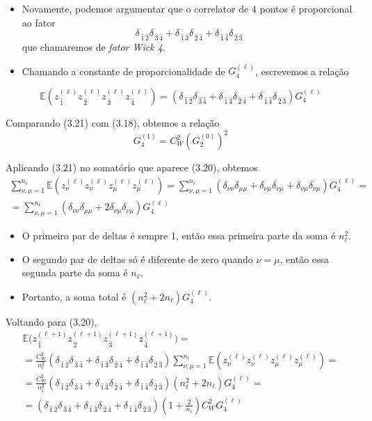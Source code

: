 \documentclass{beamer}
\newcommand{\EE}{\mathbb{E}}
\def\mi#1{{\,\widehat{#1}}}
\def\eell{{(\ell)}}
\def\eellum{{(\ell+1)}}
\def\wickquatro{\delta_{\mi1\mi2}\delta_{\mi3\mi4} + \delta_{\mi1\mi3}\delta_{\mi2\mi4}+  \delta_{\mi1\mi4}\delta_{\mi2\mi3}}
\begin{document}
\begin{frame}
	\begin{itemize}
		\item Novamente, podemos argumentar que o correlator de 4 pontos é proporcional ao fator 
		 $$\wickquatro $$
		que chamaremos de \textit{fator Wick 4}.
		\item Chamando a constante de proporcionalidade de $G_4^\eell$, escrevemos a relação
	\end{itemize}

	\begin{equation*}\tag{3.21}
		\EE\left(z^\eell _\mi1 z^\eell_\mi2 z^\eell_\mi3 z^\eell_\mi4\right) = \left(\wickquatro \right)G_4^\eell
	\end{equation*}
\end{frame}

\begin{frame}
	Comparando (3.21) com (3.18), obtemos a relação
	\begin{equation*}\tag{3.22}
		G_4^{(1)} = {C_W^2}\left(G_2^{(0)}\right)^2
	\end{equation*}
\end{frame}

\begin{frame}
	
	Aplicando (3.21) no somatório que aparece (3.20), obtemos
	\begin{multline*}\tag{3.23}
		\sum_{\nu,\mu=1}^{n_\ell} \EE\left( z^\eell_{\nu}z^\eell_{\nu} z^\eell_{\mu}z^\eell_{\mu}\right)
		= \sum_{\nu,\mu=1}^{n_\ell} \left( \delta_{\nu\nu}\delta_{\mu\mu} + \delta_{\nu\mu}\delta_{\nu\mu} + \delta_{\nu\mu}\delta_{\nu\mu}\right)G^\eell_4=\\
		= \sum_{\nu,\mu=1}^{n_\ell}  \left( \delta_{\nu\nu}\delta_{\mu\mu} + 2\delta_{\nu\mu}\delta_{\nu\mu}\right)G^\eell_4
		\end{multline*}
		\begin{itemize}
			\item O primeiro par de deltas é sempre 1, então essa primeira parte da soma é $n_\ell^2$.
			\item O segundo par de deltas só é diferente de zero quando $\nu = \mu$, então essa segunda parte da soma é $n_\ell$.
			\item Portanto, a soma total é $\left(n_\ell^2 + 2n_\ell\right)G^\eell_4$.
		\end{itemize}
\end{frame}

\begin{frame}
	Voltando para (3.20),
	\begin{multline*}
		\EE\big(z^\eellum_{\mi1} z^\eellum_{\mi2} z^\eellum_{\mi3} z^\eellum_{\mi4}\big) = \\
		= \frac{C_W^2}{n_\ell^2}\left(\wickquatro \right)\sum_{\nu,\mu=1}^{n_\ell} \EE\left( z^\eell_{\nu}z^\eell_{\nu} z^\eell_{\mu}z^\eell_{\mu}\right)= \\
		= \frac{C_W^2}{n_\ell^2}\left(\wickquatro \right)\left(n_\ell^2 + 2n_\ell\right)G^\eell_4 = \\
		= \left(\wickquatro \right) \left(1 + \frac{2}{n_\ell}\right)C_W^2 G^\eell_4
	\end{multline*}
\end{frame}
\end{document}

